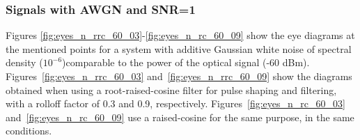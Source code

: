 \subsubsection*{Signals with AWGN and SNR=1}
Figures \ref{fig:eyes_n_rrc_60_03}-\ref{fig:eyes_n_rc_60_09} show the eye diagrams at the mentioned points for a system with additive Gaussian white noise of spectral density ($10^{-6}$)comparable to the power of the optical signal (-60 dBm). Figures~\ref{fig:eyes_n_rrc_60_03} and~\ref{fig:eyes_n_rrc_60_09} show the diagrams obtained when using a root-raised-cosine filter for pulse shaping and filtering, with a rolloff factor of 0.3 and 0.9, respectively. Figures~\ref{fig:eyes_n_rc_60_03} and~\ref{fig:eyes_n_rc_60_09} use a raised-cosine for the same purpose, in the same conditions.




